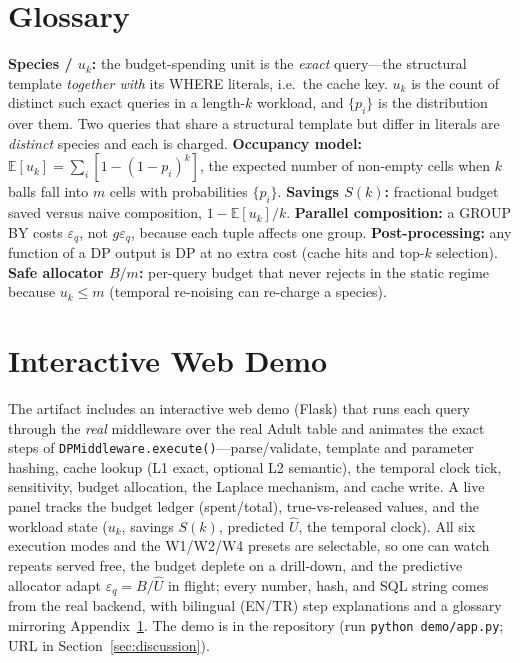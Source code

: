 \documentclass[sigconf,nonacm]{acmart}
\newcommand{\eps}{\varepsilon}
\newcommand{\E}{\mathbb{E}}
\begin{document}
\section{Glossary}
\label{app:glossary}

\noindent\textbf{Species / $u_k$:} the budget-spending unit is the \emph{exact} query---the structural template \emph{together with} its WHERE literals, i.e.\ the cache key. $u_k$ is the count of distinct such exact queries in a length-$k$ workload, and $\{p_i\}$ is the distribution over them. Two queries that share a structural template but differ in literals are \emph{distinct} species and each is charged.
\textbf{Occupancy model:} $\E[u_k]=\sum_i[1-(1-p_i)^k]$, the expected number of non-empty cells when $k$ balls fall into $m$ cells with probabilities $\{p_i\}$.
\textbf{Savings $S(k)$:} fractional budget saved versus naive composition, $1-\E[u_k]/k$.
\textbf{Parallel composition:} a GROUP BY costs $\eps_q$, not $g\eps_q$, because each tuple affects one group.
\textbf{Post-processing:} any function of a DP output is DP at no extra cost (cache hits and top-$k$ selection).
\textbf{Safe allocator $B/m$:} per-query budget that never rejects in the static regime because $u_k\le m$ (temporal re-noising can re-charge a species).

\section{Interactive Web Demo}
\label{app:demo}
The artifact includes an interactive web demo (Flask) that runs each query through the \emph{real} middleware over the real Adult table and animates the exact steps of \texttt{DPMiddleware.execute()}---parse/validate, template and parameter hashing, cache lookup (L1 exact, optional L2 semantic), the temporal clock tick, sensitivity, budget allocation, the Laplace mechanism, and cache write. A live panel tracks the budget ledger (spent/total), true-vs-released values, and the workload state ($u_k$, savings $S(k)$, predicted $\hat U$, the temporal clock). All six execution modes and the W1/W2/W4 presets are selectable, so one can watch repeats served free, the budget deplete on a drill-down, and the predictive allocator adapt $\eps_q{=}B/\hat U$ in flight; every number, hash, and SQL string comes from the real backend, with bilingual (EN/TR) step explanations and a glossary mirroring Appendix~\ref{app:glossary}. The demo is in the repository (run \texttt{python demo/app.py}; URL in Section~\ref{sec:discussion}).
\end{document}
